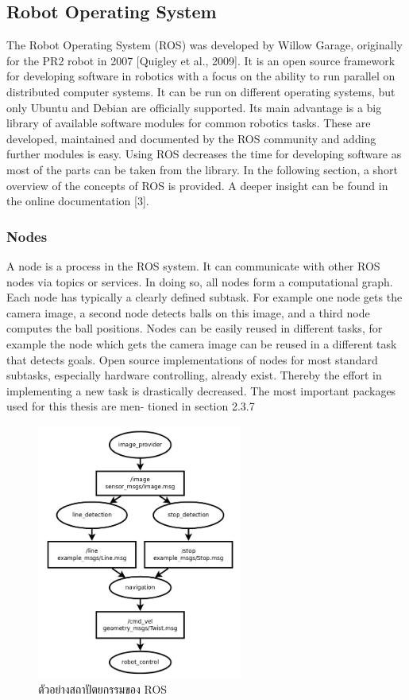 \subsection{Robot Operating System}
The Robot Operating System (ROS) was developed by Willow Garage,  originally
for  the  PR2  robot  in  2007  [Quigley et al., 2009].   It  is  an  open  source  framework
for  developing  software  in  robotics  with  a  focus  on  the  ability  to  run  parallel  on
distributed  computer  systems.   It  can  be  run  on  different  operating  systems,  but
only Ubuntu and Debian are officially supported.  Its main advantage is a big library
of  available  software  modules  for  common  robotics  tasks.   These  are  developed,
maintained and documented by the ROS community and adding further modules is
easy.  Using ROS decreases the time for developing software as most of the parts can
be taken from the library.  In the following section, a short overview of the concepts
of ROS is provided.  A deeper insight can be found in the online documentation [3].

\subsubsection*{Nodes}
A node is a process in the ROS system.  It can communicate with other ROS nodes
via  topics  or  services.   In  doing  so,  all  nodes  form  a  computational  graph.   Each
node has typically a clearly defined subtask.  For example one node gets the camera
image, a second node detects balls on this image, and a third node computes the
ball positions.  Nodes can be easily reused in different tasks, for example the node
which gets the camera image can be reused in a different task that detects goals.
Open  source  implementations  of  nodes  for  most  standard  subtasks,  especially
hardware controlling, already exist.  Thereby the effort in implementing a new task
is drastically decreased.  The most important packages used for this thesis are men-
tioned in section 2.3.7

\begin{figure}[htbp]
    \centering
    \includegraphics[width=0.6\textwidth]{chapter2/images/example_ros.png}
    \caption{ตัวอย่างสถาปัตยกรรมของ ROS}
    \label{fig:poppy_humanoid}
\end{figure}

